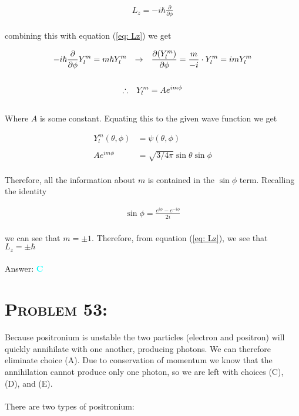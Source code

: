 \documentclass{article}
\begin{document}
\begin{gather}
L_{z} = - i \hbar \frac{\partial}{\partial \phi}
\end{gather}
\\
combining this with equation (\ref{eq: Lz}) we get

\begin{gather}
- i \hbar \frac{\partial}{\partial \phi} Y^{m}_{l} = m\hbar Y^{m}_{l} 
\hspace{.1in} \rightarrow \hspace{.1in} 
\frac{\partial (Y^{m}_{l})}{\partial \phi}  = \frac{m}{-i} \cdot Y^{m}_{l} = i m Y^{m}_{l} \nonumber\\
 \nonumber\\
\therefore \hspace{.1in} Y^{m}_{l} = Ae^{i m \phi} \nonumber
\end{gather}
\\
Where $A$ is some constant. Equating this to the given wave function we get 

\begin{align}
Y^{m}_{l}(\theta , \phi) &= \psi (\theta , \phi)\nonumber\\
\nonumber\\
Ae^{i m \phi} &= \sqrt{3/4 \pi} \sin{\theta} \sin{\phi}\nonumber
\end{align}
\\
Therefore, all the information about $m$ is contained in the $\sin{\phi}$ term. Recalling the identity

\begin{gather}
\sin{\phi} = \frac{e^{i \phi} - e^{-i \phi}}{2i}
\end{gather}
\\
we can see that $m = \pm 1$. Therefore, from equation (\ref{eq: Lz}), we see that $L_{z} = \pm \hbar$
\\\\
Answer: \textbf{\textcolor{cyan}C}\\


\section{\textsc{Problem 53:}} Because positronium is unstable the two particles (electron and positron) will quickly annihilate with one another, producing photons. We can therefore eliminate choice (A). Due to conservation of momentum we know that the annihilation cannot produce only one photon, so we are left with choices (C), (D), and (E).\\
\\
There are two types of positronium:
\end{document}
